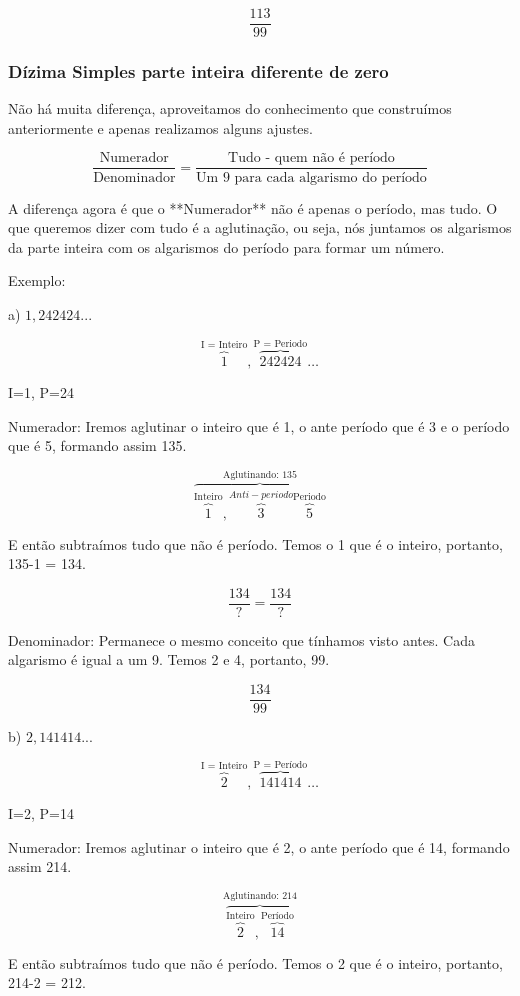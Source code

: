 \documentclass[letterpaper]{book}
\begin{document}
\[\dfrac{113}{99}\]

\subsubsection{Dízima Simples parte inteira diferente de zero}

Não há muita diferença, aproveitamos do conhecimento que construímos anteriormente e apenas realizamos alguns ajustes.

\[\dfrac{\text{Numerador}}{\text{Denominador}} = \dfrac{\text{Tudo - quem não é período}}{\text{Um 9 para cada algarismo do período}}\]

A diferença agora é que o **Numerador** não é apenas o período, mas tudo. O que queremos dizer com tudo é a aglutinação, ou seja, nós juntamos os algarismos da parte inteira com os algarismos do período para formar um número.

Exemplo:

a) \(1,242424...\)

\[\overbrace{1}^{\text{I = Inteiro}},\overbrace{242424}^{\text{P = Periodo}}\ldots\]

I=1, P=24

Numerador: Iremos aglutinar o inteiro que é 1, o ante período que é 3 e o período que é 5, formando assim 135.

\[\overbrace{\overbrace{1}^{\text{Inteiro}},\overbrace{3}^{Anti-periodo }\overbrace{5}^{\text{Periodo}}}^{\text{Aglutinando: }135}\]

E então subtraímos tudo que não é período. Temos o 1 que é o inteiro, portanto, 135-1 = 134.

\[\dfrac{134}{?} = \dfrac{134}{?}\]

Denominador: Permanece o mesmo conceito que tínhamos visto antes. Cada algarismo é igual a um 9. Temos 2 e 4, portanto, 99.

\[\dfrac{134}{99}\]

b) \(2,141414...\)

\[\overbrace{2}^{\text{I = Inteiro}},\overbrace{141414}^{\text{P = Período}}\ldots\]

I=2, P=14

Numerador: Iremos aglutinar o inteiro que é 2, o ante período que é 14, formando assim 214.

\[\overbrace{\overbrace{2}^{\text{Inteiro}},\overbrace{14}^{\text{Período}}}^{\text{Aglutinando: }214}\]

E então subtraímos tudo que não é período. Temos o 2 que é o inteiro, portanto, 214-2 = 212.
\end{document}
